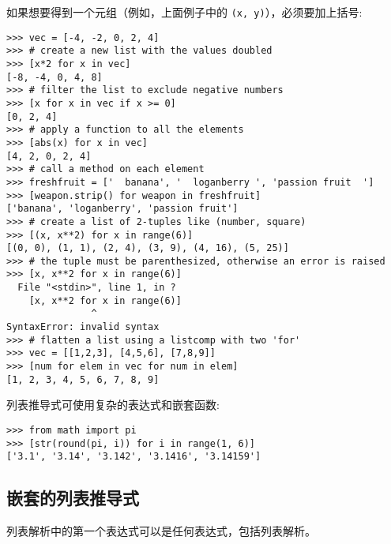 如果想要得到一个元组（例如，上面例子中的 \texttt{(x, y)}），必须要加上括号:
\begin{lstlisting}
>>> vec = [-4, -2, 0, 2, 4]
>>> # create a new list with the values doubled
>>> [x*2 for x in vec]
[-8, -4, 0, 4, 8]
>>> # filter the list to exclude negative numbers
>>> [x for x in vec if x >= 0]
[0, 2, 4]
>>> # apply a function to all the elements
>>> [abs(x) for x in vec]
[4, 2, 0, 2, 4]
>>> # call a method on each element
>>> freshfruit = ['  banana', '  loganberry ', 'passion fruit  ']
>>> [weapon.strip() for weapon in freshfruit]
['banana', 'loganberry', 'passion fruit']
>>> # create a list of 2-tuples like (number, square)
>>> [(x, x**2) for x in range(6)]
[(0, 0), (1, 1), (2, 4), (3, 9), (4, 16), (5, 25)]
>>> # the tuple must be parenthesized, otherwise an error is raised
>>> [x, x**2 for x in range(6)]
  File "<stdin>", line 1, in ?
    [x, x**2 for x in range(6)]
               ^
SyntaxError: invalid syntax
>>> # flatten a list using a listcomp with two 'for'
>>> vec = [[1,2,3], [4,5,6], [7,8,9]]
>>> [num for elem in vec for num in elem]
[1, 2, 3, 4, 5, 6, 7, 8, 9]
\end{lstlisting}
列表推导式可使用复杂的表达式和嵌套函数:
\begin{lstlisting}
>>> from math import pi
>>> [str(round(pi, i)) for i in range(1, 6)]
['3.1', '3.14', '3.142', '3.1416', '3.14159']
\end{lstlisting}
\subsection{嵌套的列表推导式}
列表解析中的第一个表达式可以是任何表达式，包括列表解析。

